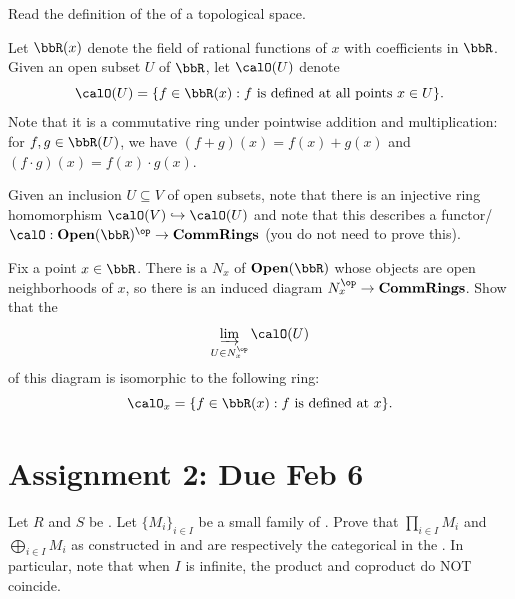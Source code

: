Read the definition of the  of a topological space.

\begin{problem}
    Let $\bbR(x)$ denote the field of rational functions of $x$ with coefficients in $\bbR$. Given an open subset $U$ of $\bbR$, let $\calO(U)$ denote 
    $$\calO(U) = \{f \in \bbR(x): f \text{ is defined at all points } x \in U\}.$$
    Note that it is a commutative ring under pointwise addition and multiplication: for $f,g \in \bbR(U)$, we have $(f+g)(x) = f(x) + g(x)$ and $(f \cdot g)(x) = f(x) \cdot g(x)$. 

    Given an inclusion $U \subseteq V$ of open subsets, note that there is an injective ring homomorphism $\calO(V) \hookrightarrow \calO(U)$ and note that this describes a functor/ $\calO: \mathbf{Open}(\bbR)^{\op} \to \mathbf{CommRings}$ (you do not need to prove this). 
    
    Fix a point $x \in \bbR$. There is a  $N_x$ of $\mathbf{Open}(\bbR)$ whose objects are open neighborhoods of $x$, so there is an induced diagram $N_x^{\op} \to \mathbf{CommRings}$. Show that the 
    $$\varinjlim_{U \in N_x^{\op}} \calO(U)$$
    of this diagram is isomorphic to the following ring:
    $$\calO_x = \{f \in \bbR(x): f \text{ is defined at } x \}.$$
\end{problem}


\newpage

\section{Assignment 2: Due Feb 6}

\begin{problem}
    Let $R$ and $S$ be . Let $\{M_i\}_{i \in I}$ be a small family of . Prove that $\prod_{i \in I} M_i$ and $\bigoplus_{i \in I} M_i$ as constructed in  and  are respectively the categorical  in the . In particular, note that when $I$ is infinite, the product and coproduct do NOT coincide.
\end{problem}

